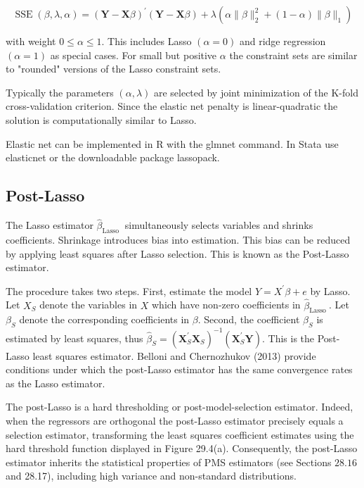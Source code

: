 \documentclass[10pt]{article}
\begin{document}
$$
\operatorname{SSE}(\beta, \lambda, \alpha)=(\boldsymbol{Y}-\boldsymbol{X} \beta)^{\prime}(\boldsymbol{Y}-\boldsymbol{X} \beta)+\lambda\left(\alpha\|\beta\|_{2}^{2}+(1-\alpha)\|\beta\|_{1}\right)
$$

with weight $0 \leq \alpha \leq 1$. This includes Lasso $(\alpha=0)$ and ridge regression $(\alpha=1)$ as special cases. For small but positive $\alpha$ the constraint sets are similar to "rounded" versions of the Lasso constraint sets.

Typically the parameters $(\alpha, \lambda)$ are selected by joint minimization of the K-fold cross-validation criterion. Since the elastic net penalty is linear-quadratic the solution is computationally similar to Lasso.

Elastic net can be implemented in R with the glmnet command. In Stata use elasticnet or the downloadable package lassopack.

\subsection{Post-Lasso}
The Lasso estimator $\widehat{\beta}_{\text {Lasso }}$ simultaneously selects variables and shrinks coefficients. Shrinkage introduces bias into estimation. This bias can be reduced by applying least squares after Lasso selection. This is known as the Post-Lasso estimator.

The procedure takes two steps. First, estimate the model $Y=X^{\prime} \beta+e$ by Lasso. Let $X_{S}$ denote the variables in $X$ which have non-zero coefficients in $\widehat{\beta}_{\text {Lasso }}$. Let $\beta_{S}$ denote the corresponding coefficients in $\beta$. Second, the coefficient $\beta_{S}$ is estimated by least squares, thus $\widehat{\beta}_{S}=\left(\boldsymbol{X}_{S}^{\prime} \boldsymbol{X}_{S}\right)^{-1}\left(\boldsymbol{X}_{S}^{\prime} \boldsymbol{Y}\right)$. This is the Post-Lasso least squares estimator. Belloni and Chernozhukov (2013) provide conditions under which the post-Lasso estimator has the same convergence rates as the Lasso estimator.

The post-Lasso is a hard thresholding or post-model-selection estimator. Indeed, when the regressors are orthogonal the post-Lasso estimator precisely equals a selection estimator, transforming the least squares coefficient estimates using the hard threshold function displayed in Figure 29.4(a). Consequently, the post-Lasso estimator inherits the statistical properties of PMS estimators (see Sections $28.16$ and 28.17), including high variance and non-standard distributions.
\end{document}
